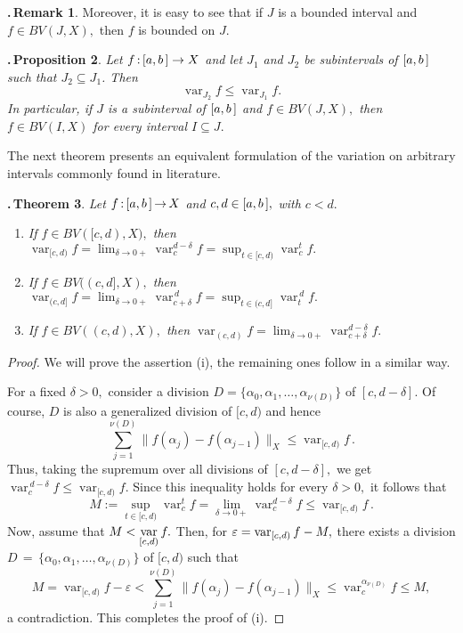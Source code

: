 \documentclass[12pt,twoside]{article}
\numberwithin{equation}{section}
\theoremstyle{plain}
\newtheorem{theorem}{\hskip-1mm.\,Theorem}[section]
\newtheorem{proposition}[theorem]{\hskip-1mm.\,Proposition}
\theoremstyle{definition}
\newtheorem{remark}[theorem]{\hskip-1mm.\,Remark}
\DeclareMathOperator{\var}{var}
\begin{document}
{\begin{remark}
Moreover, it is easy to see that if $J$ is a bounded interval and $f\in BV(J,X),$ then
$f$ is bounded on $J.$
\end{remark}

\smallskip

\begin{proposition}
Let $f\,{:}\,[a,b\,]\to X$ and let $J_1$ and $J_2$ be subintervals of $[a,b\,]$ such that
$J_2\subseteq J_1$. Then
\[
   \var_{J_2}f\le\var_{J_1}f.
\]
In particular, if $J$ is a subinterval of $[a,b\,]$ and $f\in BV(J,X),$ then
$f\in BV(I,X)$ for every interval $I\subseteq J.$
\end{proposition}

\smallskip

The next theorem presents an equivalent formulation of the variation on arbitrary
intervals commonly found in literature.

\smallskip

\begin{theorem}\label{T4.4}
Let $f\,{:}\,[a,b\,]\,{\to}\,X$ and $c,d\in[a,b\,],$ with $c<d.$
\begin{enumerate}[{\rm(i)}]
\item If $f\in BV([c,d),X),$ then
\quad $\var_{[c,d)}f=\lim_{\delta\to 0+}\var_c^{d{-}\delta}f=\sup_{t\in[c,d)}\var_c^tf.$

\item If $f\in BV((c,d],X),$ then
\quad $\var_{(c,d]}f=\lim_{\delta\to 0+}\var_{c{+}\delta}^{\,d}f=\sup_{t\in(c,d]}\var_t^{\,d}f.$

\item If $f\in BV((c,d),X),$ then
\quad $\var_{(c,d)}f=\lim_{\delta\to 0+}\var_{c{+}\delta}^{d-\delta}f.$
\end{enumerate}
\end{theorem}
\begin{proof} We will prove the assertion (i), the remaining ones follow in a similar way.

\smallskip

For a fixed $\delta>0,$ consider a division $D=\{\alpha_0,\alpha_1,\ldots,\alpha_{\nu(D)}\}$
of $[c,d{-}\delta].$ Of course, $D$ is also a generalized division of $[c,d)$ and hence
\[
   \sum_{j=1}^{\nu(D)}\|f(\alpha_j)-f(\alpha_{j-1})\|_X\le\var_{[c,d)}f\,.
\]
Thus, taking the supremum over all divisions of $[c,d-\delta],$ we get
$\var_c^{\,d{-}\delta}f\le\var_{[c,d)}f.$ Since this inequality holds for every
$\delta>0,$ it follows that
\[
    M:=\sup_{t\in[c,d)}\var_c^t f
      =\lim_{\delta\to 0+}\var_c^{d{-}\delta}f\le\var_{[c,d)}f\,.
\]
Now, assume that $\dis M<\var_{[c,d)}f.$ Then, for $\eps=\var_{[c,d)}f-M,$ there exists
a division $D\,{=}\,\{\alpha_0,\alpha_1,\ldots,\alpha_{\nu(D)}\}$ of $[c,d)$ such that
\[
   M=\var_{[c,d)}f-\varepsilon<\sum_{j=1}^{\nu(D)}\|f(\alpha_j)-f(\alpha_{j-1})\|_X
                            \le\var_c^{\alpha_{\nu(D)}}f\le M,
\]
a contradiction. This completes the proof of (i).
\end{proof}

}
\end{document}
